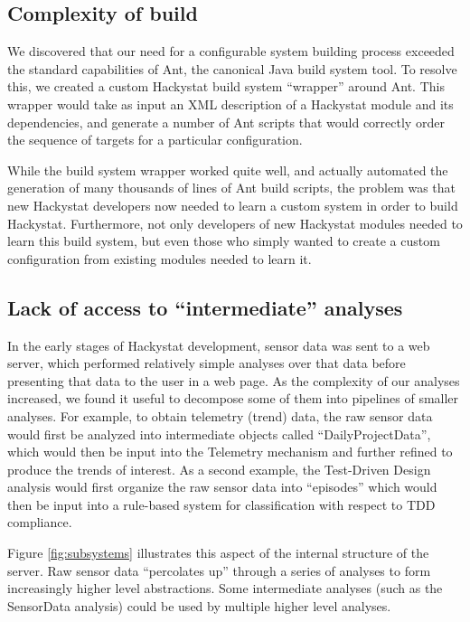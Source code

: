 \documentclass[conference,compsoc]{IEEEtran}
\begin{document}
\subsection{Complexity of build}

We discovered that our need for a configurable system building process
exceeded the standard capabilities of Ant, the canonical Java build system
tool.  To resolve this, we created a custom Hackystat build system
``wrapper'' around Ant.  This wrapper would take as input an XML
description of a Hackystat module and its dependencies, and generate a
number of Ant scripts that would correctly order the sequence of targets
for a particular configuration.

While the build system wrapper worked quite well, and actually automated
the generation of many thousands of lines of Ant build scripts, the problem
was that new Hackystat developers now needed to learn a custom 
system in order to build Hackystat.  Furthermore,
not only developers of new Hackystat modules needed to learn this build
system, but even those who simply wanted to create a custom configuration
from existing modules needed to learn it.


\subsection{Lack of access to ``intermediate'' analyses}

In the early stages of Hackystat development, sensor data was sent to a web
server, which performed relatively simple analyses over that data before
presenting that data to the user in a web page.  As the complexity of our
analyses increased, we found it useful to decompose some of them into
pipelines of smaller analyses.  For example, to obtain telemetry (trend)
data, the raw sensor data would first be analyzed into intermediate objects
called ``DailyProjectData'', which would then be input into the Telemetry
mechanism and further refined to produce the trends of interest.  As a
second example, the Test-Driven Design analysis would first organize the
raw sensor data into ``episodes'' which would then be input into a
rule-based system for classification with respect to TDD compliance.

Figure \ref{fig:subsystems} illustrates this aspect of the internal structure
of the server.  Raw sensor data ``percolates up'' through a series of analyses
to form increasingly higher level abstractions.  Some intermediate analyses 
(such as the SensorData analysis) could be used by multiple higher level analyses.
\end{document}
